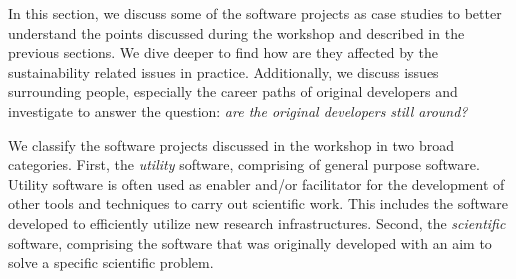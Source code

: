 \documentclass[11pt, oneside]{amsart}
\begin{document}







In this section, we discuss some of the software projects as case studies to
better understand the points discussed during the workshop and described in the
previous sections. We dive deeper to find how are they affected by the
sustainability related issues in practice. Additionally, we discuss issues
surrounding people, especially the career paths of original developers and
investigate to answer the question: \emph{are the original developers still
around?}

We classify the software projects discussed in the workshop in two broad
categories. First, the \emph{utility} software, comprising of general purpose
software. Utility software is often used as enabler and/or facilitator for the
development of other tools and techniques to carry out scientific work. This
includes the software developed to efficiently utilize new research
infrastructures. Second, the \emph{scientific} software, comprising the
software that was originally developed with an aim to solve a specific
scientific problem.
\end{document}
